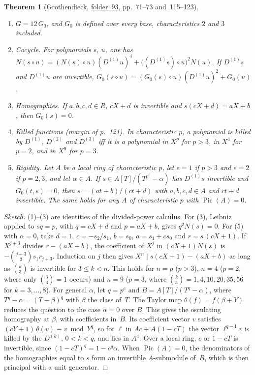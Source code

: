 \documentclass[11pt,a4paper]{amsart}
\newtheorem{theorem}{Theorem}[section]
\theoremstyle{definition}
\theoremstyle{remark}
\newcommand{\fac}[1]{\href{https://grothendieck.umontpellier.fr/#1.pdf}{folder~#1}}
\begin{document}
\begin{theorem}[Grothendieck, \fac{93}, pp.~71--73 and~115--123]\label{thm:schwarz}
\leavevmode
\begin{enumerate}
\item $G = 12\,G_0$, and $G_0$ is defined over every base, characteristics $2$ and $3$ included.
\item \emph{Cocycle.} For polynomials $s$, $u$, one has $N(s \circ u) = (N(s)\circ u)(D^{(1)}u)^4 + \bigl((D^{(1)}s)\circ u\bigr)^2N(u)$. If $D^{(1)}s$ and $D^{(1)}u$ are invertible, $G_0(s \circ u) = (G_0(s)\circ u)(D^{(1)}u)^2 + G_0(u)$.
\item \emph{Homographies.} If $a, b, c, d \in R$, $cX + d$ is invertible and $s(cX + d) = aX + b$, then $G_0(s) = 0$.
\item \emph{Killed functions} (margin of p.~121). In characteristic $p$, a polynomial is killed by $D^{(1)}$, $D^{(2)}$ and $D^{(3)}$ iff it is a polynomial in $X^p$ for $p > 3$, in $X^4$ for $p = 2$, and in $X^9$ for $p = 3$.
\item \emph{Rigidity.} Let $A$ be a local ring of characteristic $p$, let $e = 1$ if $p > 3$ and $e = 2$ if $p = 2, 3$, and let $\alpha \in A$. If $s \in A[T]/(T^{p^e} - \alpha)$ has $D^{(1)}s$ invertible and $G_0(t, s) = 0$, then $s = (at + b)/(ct + d)$ with $a, b, c, d \in A$ and $ct + d$ invertible. The same holds for any $A$ of characteristic $p$ with $\operatorname{Pic}(A) = 0$.
\end{enumerate}
\end{theorem}

\begin{proof}[Sketch]
(1)--(3) are identities of the divided-power calculus. For (3), Leibniz applied to $sq = p$, with $q = cX + d$ and $p = aX + b$, gives $q^2N(s) = 0$. For (5) with $\alpha = 0$, take $d = 1$, $c = -s_2/s_1$, $b = s_0$, $a = s_1 + cs_0$ and $r = s\,(cX + 1)$. If $X^{j+3}$ divides $r - (aX + b)$, the coefficient of $X^j$ in $(cX + 1)N(s)$ is $-\binom{j+3}{3}s_1r_{j+3}$. Induction on $j$ then gives $X^n \mid s(cX + 1) - (aX + b)$ as long as $\binom k3$ is invertible for $3 \le k < n$. This holds for $n = p$ ($p > 3$), $n = 4$ ($p = 2$, where only $\binom33 = 1$ occurs) and $n = 9$ ($p = 3$, where $\binom k3 = 1, 4, 10, 20, 35, 56$ for $k = 3, \dots, 8$). For general $\alpha$, let $q = p^e$ and $B = A[T]/(T^q - \alpha)$, where $T^q - \alpha = (T - \beta)^q$ with $\beta$ the class of~$T$. The Taylor map $\theta(f) = f(\beta + Y)$ reduces the question to the case $\alpha = 0$ over $B$. This gives the osculating homography at $\beta$, with coefficients in~$B$. Its coefficient vector $v$ satisfies $(cY + 1)\,\theta(v) \equiv v \bmod Y^q$, so for $\ell$ in $Ac + A(1 - cT)$ the vector $\ell^{q-1}v$ is killed by the $D^{(k)}$, $0 < k < q$, and lies in $A^4$. Over a local ring, $c$ or $1 - cT$ is invertible, since $(1 - cT)^q = 1 - c^q\alpha$. When $\operatorname{Pic}(A) = 0$, the denominators of the homographies equal to $s$ form an invertible $A$-submodule of~$B$, which is then principal with a unit generator.
\end{proof}
\end{document}
